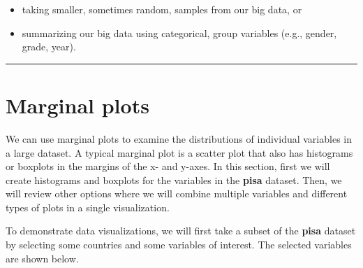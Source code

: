 \documentclass[]{book}
\providecommand{\tightlist}{%
  \setlength{\itemsep}{0pt}\setlength{\parskip}{0pt}}
\begin{document}
\begin{itemize}
\tightlist
\item
  taking smaller, sometimes random, samples from our big data, or
\item
  summarizing our big data using categorical, group variables (e.g., gender, grade, year).
\end{itemize}

\begin{center}\rule{0.5\linewidth}{\linethickness}\end{center}

\hypertarget{marginal-plots}{%
\section{Marginal plots}\label{marginal-plots}}

We can use marginal plots to examine the distributions of individual variables in a large dataset. A typical marginal plot is a scatter plot that also has histograms or boxplots in the margins of the x- and y-axes. In this section, first we will create histograms and boxplots for the variables in the \textbf{pisa} dataset. Then, we will review other options where we will combine multiple variables and different types of plots in a single visualization.

To demonstrate data visualizations, we will first take a subset of the \textbf{pisa} dataset by selecting some countries and some variables of interest. The selected variables are shown below.
\end{document}
